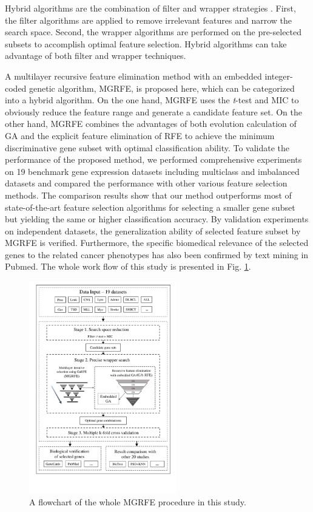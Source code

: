\documentclass[10pt,journal,compsoc]{IEEEtran}
\begin{document}
	Hybrid algorithms are the combination of filter and wrapper strategies \cite{W6}. First, the filter algorithms are applied to remove irrelevant features and narrow the search space. Second, the wrapper algorithms are performed on the pre-selected subsets to accomplish optimal feature selection. Hybrid algorithms can take advantage of both filter and wrapper techniques.
	
	A multilayer recursive feature elimination method with an embedded integer-coded genetic algorithm, MGRFE, is proposed here, which can be categorized into a hybrid algorithm. On the one hand, MGRFE uses the \textit{t}-test and MIC to obviously reduce the feature range and generate a candidate feature set. On the other hand, MGRFE combines the advantages of both evolution calculation of GA and the explicit feature elimination of RFE to achieve the minimum discriminative gene subset with optimal classification ability.
	To validate the performance of the proposed method, we performed comprehensive experiments on 19 benchmark gene expression datasets including multiclass and imbalanced datasets and   compared the performance with other various feature selection methods. 
	The comparison results show that our method outperforms most of state-of-the-art feature selection algorithms for selecting a smaller gene subset but yielding the same or higher classification accuracy. By validation experiments on independent datasets, the generalization ability of selected feature subset by MGRFE is verified. Furthermore, the specific biomedical relevance of the selected genes to the related cancer phenotypes has also been confirmed by text mining in Pubmed. The whole work flow of this study is presented in Fig. \ref{Fig:MGRFE_whole}.

	
	\begin{figure}[!htbp]
		\centering
		\includegraphics[width=0.57\textwidth]{pictures/MGRFE-whole.pdf}
		\caption{A flowchart of the whole MGRFE procedure in this study.}
		\label{Fig:MGRFE_whole}
	\end{figure}
	
\end{document}
